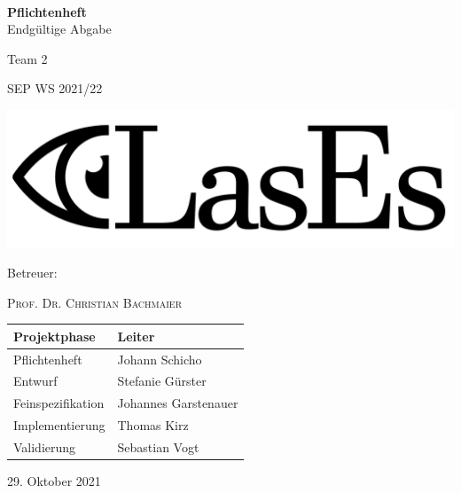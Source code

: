 \documentclass[a4paper,11pt]{article}
\newcommand{\doubletitle}[2]{\title{#1 \\ [1ex] \normalsize #2}}
\begin{document}
	\begin{titlepage}
		\centering

		$~$

		\vspace{0.2cm} %

		\Huge \textbf{Pflichtenheft}\\
		\normalsize Endgültige Abgabe\vspace{0.5cm}

		\Huge Team 2
		\Large

		SEP WS 2021/22

		\vspace{2cm}

		\includegraphics[width=0.8\linewidth]{graphics/LasEs-logo}

		\vspace{2cm}

		Betreuer:

		\textsc{Prof. Dr. Christian Bachmaier}

		\vspace{1cm}

		\begin{table}[H]
			\centering
			\Large
			\begin{tabular}{ll}
				\toprule
				\textbf{Projektphase} & \textbf{Leiter} \\
				\midrule
				Pflichtenheft & Johann Schicho \\
				Entwurf & Stefanie Gürster \\
				Feinspezifikation & Johannes Garstenauer \\
				Implementierung & Thomas Kirz \\
				Validierung & Sebastian Vogt \\
				\bottomrule
			\end{tabular}
		\end{table}

	\vspace{1cm}

	29. Oktober 2021

	\end{titlepage}

\end{document}
